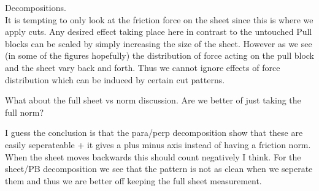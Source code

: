 Decompositions. \\
It is tempting to only look at the friction force on the sheet since this is where we apply cuts. Any desired effect taking place here in contrast to the untouched Pull blocks can be scaled by simply increasing the size of the sheet. However as we see (in some of the figures hopefully) the distribution of force acting on the pull block and the sheet vary back and forth. Thus we cannot ignore effects of force distribution which can be induced by certain cut patterns. 

What about the full sheet vs norm discussion. Are we better of just taking the full norm?

I guess the conclusion is that the para/perp decomposition show that these are easily seperateable + it gives a plus minus axis instead of having a friction norm. When the sheet moves backwards this should count negatively I think. For the sheet/PB decomposition we see that the pattern is not as clean when we seperate them and thus we are better off keeping the full sheet measurement.

